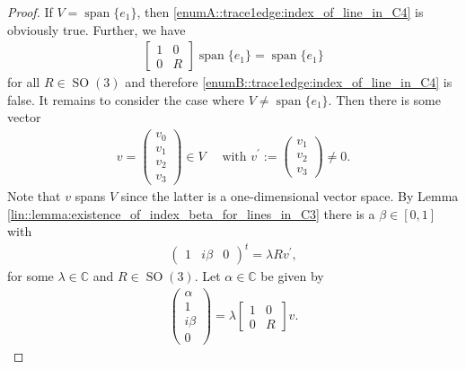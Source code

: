 \documentclass{amsart}
\newcommand{\C}{\mathbb{C}}
\DeclareMathOperator{\SO}{SO}
\DeclareMathOperator{\spann}{span}
\begin{document}
\begin{proof}
    If $V = \spann\{e_1\}$, then \ref{enumA::trace1edge:index_of_line_in_C4} is obviously true. Further, we have 
    \begin{align*}
         \left[\begin{array}{c|c}
        1 & 0 \\
        \hline
        0 & R
        \end{array}\right] \spann\{e_1\} = \spann\{e_1\}
    \end{align*}
    for all $R \in \SO(3)$ and therefore \ref{enumB::trace1edge:index_of_line_in_C4} is false. It remains to consider the case where $V \neq \spann\{e_1\}$. Then there is some vector
    \begin{align*}
        v = \begin{pmatrix}
            v_0 \\ v_1 \\ v_2 \\ v_3
        \end{pmatrix}
        \in V 
        \quad \text{ with }
        v^\prime := \begin{pmatrix}
            v_1 \\ v_2 \\ v_3
        \end{pmatrix} \neq 0.
    \end{align*}
    Note that $v$ spans $V$ since the latter is a one-dimensional vector space. By Lemma \ref{lin::lemma:existence_of_index_beta_for_lines_in_C3} there is a $\beta \in [0,1]$ with
    \begin{align*}
        \begin{pmatrix}
            1 & i \beta & 0
        \end{pmatrix}^t
        = \lambda R v^\prime,
    \end{align*}
    for some $\lambda \in \C$ and $R \in \SO(3)$. Let $\alpha \in \C$ be given by 
    \begin{align*}
        \begin{pmatrix}
            \alpha \\ 1 \\ i \beta \\ 0
        \end{pmatrix}
        = \lambda \left[\begin{array}{c|c}
            1 & 0 \\
            \hline
            0 & R
            \end{array}\right] v.
    \end{align*}

\end{proof}
\end{document}
